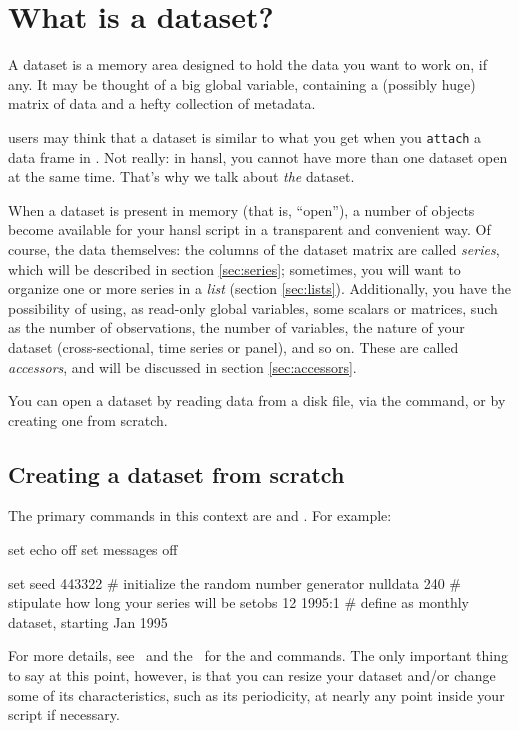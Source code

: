\chapter{What is a dataset?}
\label{chap:dataset}

A dataset is a memory area designed to hold the data you want to work
on, if any. It may be thought of a big global variable, containing a
(possibly huge) matrix of data and a hefty collection of metadata.

 users may think that a dataset is similar to what you get when
you \texttt{attach} a data frame in . Not really: in hansl, you
cannot have more than one dataset open at the same time. That's why we
talk about \emph{the} dataset.

When a dataset is present in memory (that is, ``open''), a number of
objects become available for your hansl script in a transparent and
convenient way. Of course, the data themselves: the columns of the
dataset matrix are called \emph{series}, which will be described in
section \ref{sec:series}; sometimes, you will want to organize one or
more series in a \emph{list} (section \ref{sec:lists}). Additionally,
you have the possibility of using, as read-only global variables, some
scalars or matrices, such as the number of observations, the number of
variables, the nature of your dataset (cross-sectional, time series or
panel), and so on. These are called \emph{accessors}, and will be
discussed in section \ref{sec:accessors}.

You can open a dataset by reading data from a disk file, via the
 command, or by creating one from scratch.

\section{Creating a dataset from scratch}

The primary commands in this context are  and
.  For example:
\begin{code}
set echo off
set messages off

set seed 443322           # initialize the random number generator
nulldata 240              # stipulate how long your series will be
setobs 12 1995:1          # define as monthly dataset, starting Jan 1995   
\end{code}

For more details, see \GUG\ and the \GCR\ for the  and
 commands. The only important thing to say at this point,
however, is that you can resize your dataset and/or change some of its
characteristics, such as its periodicity, at nearly any point inside
your script if necessary.

